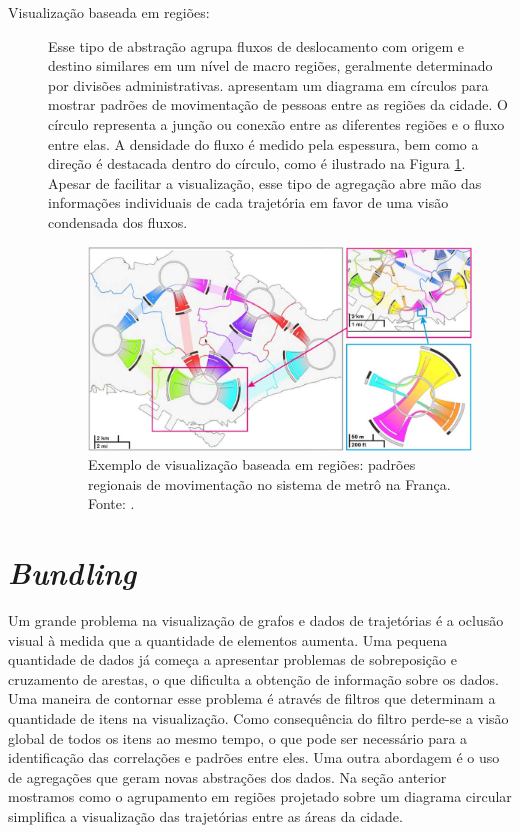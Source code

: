 \begin{description}
  \item[Visualização baseada em regiões:] Esse tipo de abstração agrupa fluxos
de deslocamento com origem e destino similares em um nível de macro regiões,
geralmente determinado por divisões administrativas.  \citet{Zeng2013}
apresentam um diagrama em círculos para mostrar padrões de movimentação de
pessoas entre as regiões da cidade. O círculo representa a junção ou conexão
entre as diferentes regiões e o fluxo entre elas. A densidade do fluxo é medido
pela espessura, bem como a direção é destacada dentro do círculo, como é
ilustrado na Figura \ref{fig:interchange-circo}. Apesar de facilitar a
visualização, esse tipo de agregação abre mão das informações individuais de
cada trajetória em favor de uma visão condensada dos fluxos.

\begin{figure}[!htb]
  \centering
  \includegraphics[width=1\textwidth]{../figuras/region-based.png}
  \caption[Exemplo de visualização baseada em regiões do sistema de metrô na França]{Exemplo de visualização baseada em regiões: padrões regionais de movimentação no sistema de metrô na França. Fonte: \citet{Zeng2013}.}
  \label{fig:interchange-circo}
\end{figure}
\end{description}

\section{\emph{Bundling}}
\label{sec:bundling}

  Um grande problema na visualização de grafos e dados de trajetórias é a
oclusão visual à medida que a quantidade de elementos aumenta. Uma pequena
quantidade de dados já começa a apresentar problemas de sobreposição e
cruzamento de arestas, o que dificulta a obtenção de informação sobre os dados.
Uma maneira de contornar esse problema é através de filtros que determinam a
quantidade de itens na visualização. Como consequência do filtro perde-se a
visão global de todos os itens ao mesmo tempo, o que pode ser necessário para a
identificação das correlações e padrões entre eles. Uma outra abordagem é o uso
de agregações que geram novas abstrações dos dados. Na seção anterior mostramos
como o agrupamento em regiões projetado sobre um diagrama circular simplifica a
visualização das trajetórias entre as áreas da cidade.

